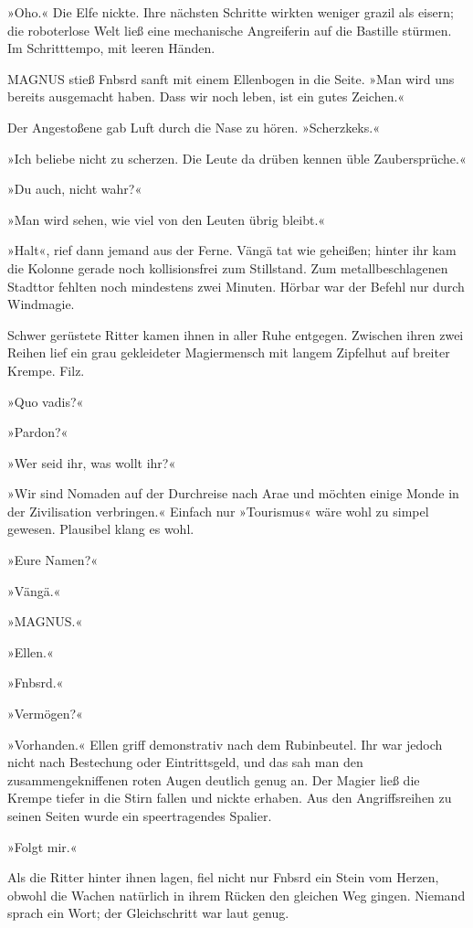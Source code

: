 »Oho.« Die Elfe nickte. Ihre nächsten Schritte wirkten weniger grazil als eisern; die roboterlose Welt ließ eine mechanische Angreiferin auf die Bastille stürmen. Im Schritttempo, mit leeren Händen.

MAGNUS stieß Fnbsrd sanft mit einem Ellenbogen in die Seite. »Man wird uns bereits ausgemacht haben. Dass wir noch leben, ist ein gutes Zeichen.«

Der Angestoßene gab Luft durch die Nase zu hören. »Scherzkeks.«

»Ich beliebe nicht zu scherzen. Die Leute da drüben kennen üble Zaubersprüche.«

»Du auch, nicht wahr?«

»Man wird sehen, wie viel von den Leuten übrig bleibt.«

»Halt«, rief dann jemand aus der Ferne. Vängä tat wie geheißen; hinter ihr kam die Kolonne gerade noch kollisionsfrei zum Stillstand. Zum metallbeschlagenen Stadttor fehlten noch mindestens zwei Minuten. Hörbar war der Befehl nur durch Windmagie.

Schwer gerüstete Ritter kamen ihnen in aller Ruhe entgegen. Zwischen ihren zwei Reihen lief ein grau gekleideter Magiermensch mit langem Zipfelhut auf breiter Krempe. Filz.

»Quo vadis?«

»Pardon?«

»Wer seid ihr, was wollt ihr?«

»Wir sind Nomaden auf der Durchreise nach Arae und möchten einige Monde in der Zivilisation verbringen.« Einfach nur »Tourismus« wäre wohl zu simpel gewesen. Plausibel klang es wohl.

»Eure Namen?«

»Vängä.«

»MAGNUS.«

»Ellen.«

»Fnbsrd.«

»Vermögen?«

»Vorhanden.« Ellen griff demonstrativ nach dem Rubinbeutel. Ihr war jedoch nicht nach Bestechung oder Eintrittsgeld, und das sah man den zusammengekniffenen roten Augen deutlich genug an. Der Magier ließ die Krempe tiefer in die Stirn fallen und nickte erhaben. Aus den Angriffsreihen zu seinen Seiten wurde ein speertragendes Spalier.

»Folgt mir.«

Als die Ritter hinter ihnen lagen, fiel nicht nur Fnbsrd ein Stein vom Herzen, obwohl die Wachen natürlich in ihrem Rücken den gleichen Weg gingen. Niemand sprach ein Wort; der Gleichschritt war laut genug.

